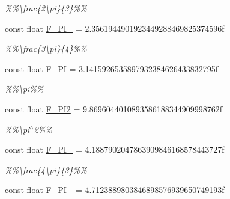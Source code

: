\begin{DoxyCompactItemize}
\begin{DoxyCompactList}\small\item\em \%\%\textbackslash{}frac\{2\textbackslash{}pi\}\{3\}\%\% \end{DoxyCompactList}\item 
\hypertarget{group___scalar_math_consts_ga0c35a004d833cc1dfbee7acbccaab09c}{}const float \hyperlink{group___scalar_math_consts_ga0c35a004d833cc1dfbee7acbccaab09c}{F\+\_\+P\+I\+\_} = 2.\+3561944901923449288469825374596f\label{group___scalar_math_consts_ga0c35a004d833cc1dfbee7acbccaab09c}

\begin{DoxyCompactList}\small\item\em \%\%\textbackslash{}frac\{3\textbackslash{}pi\}\{4\}\%\% \end{DoxyCompactList}\item 
\hypertarget{group___scalar_math_consts_gafafb6dc6f6a78d4380d623b37686827b}{}const float \hyperlink{group___scalar_math_consts_gafafb6dc6f6a78d4380d623b37686827b}{F\+\_\+\+P\+I} = 3.\+1415926535897932384626433832795f\label{group___scalar_math_consts_gafafb6dc6f6a78d4380d623b37686827b}

\begin{DoxyCompactList}\small\item\em \%\%\textbackslash{}pi\%\% \end{DoxyCompactList}\item 
\hypertarget{group___scalar_math_consts_gaf59322d3dc0e90033f44d217583e9610}{}const float \hyperlink{group___scalar_math_consts_gaf59322d3dc0e90033f44d217583e9610}{F\+\_\+\+P\+I2} = 9.\+8696044010893586188344909998762f\label{group___scalar_math_consts_gaf59322d3dc0e90033f44d217583e9610}

\begin{DoxyCompactList}\small\item\em \%\%\textbackslash{}pi$^\wedge$2\%\% \end{DoxyCompactList}\item 
\hypertarget{group___scalar_math_consts_ga66ec3d4c6fb8f4879f419676a5cd1ae3}{}const float \hyperlink{group___scalar_math_consts_ga66ec3d4c6fb8f4879f419676a5cd1ae3}{F\+\_\+P\+I\+\_} = 4.\+1887902047863909846168578443727f\label{group___scalar_math_consts_ga66ec3d4c6fb8f4879f419676a5cd1ae3}

\begin{DoxyCompactList}\small\item\em \%\%\textbackslash{}frac\{4\textbackslash{}pi\}\{3\}\%\% \end{DoxyCompactList}\item 
\hypertarget{group___scalar_math_consts_ga7f5e7bc15600bd01690e89244107f84f}{}const float \hyperlink{group___scalar_math_consts_ga7f5e7bc15600bd01690e89244107f84f}{F\+\_\+P\+I\+\_} = 4.\+7123889803846898576939650749193f\label{group___scalar_math_consts_ga7f5e7bc15600bd01690e89244107f84f}


\end{DoxyCompactItemize}
